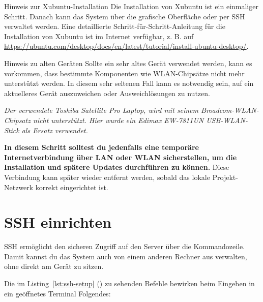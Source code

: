 \begin{InfoBox}{Hinweis zur Xubuntu-Installation}
    \scriptsize Die Installation von Xubuntu ist ein einmaliger Schritt. Danach kann das System über die grafische Oberfläche oder per SSH verwaltet werden. Eine detaillierte Schritt-für-Schritt-Anleitung für die Installation von Xubuntu ist im Internet verfügbar, z. B. auf \url{https://ubuntu.com/desktop/docs/en/latest/tutorial/install-ubuntu-desktop/}.
\end{InfoBox}

\begin{InfoBox}{Hinweis zu alten Geräten}
    \scriptsize Sollte ein sehr altes Gerät verwendet werden, kann es vorkommen, dass bestimmte Komponenten wie WLAN-Chipsätze nicht mehr unterstützt werden. In diesem sehr seltenen Fall kann es notwendig sein, auf ein aktuelleres Gerät auszuweichen oder Ausweichlösungen zu nutzen.
    
    \textit{Der verwendete Toshiba Satellite Pro Laptop, wird mit seinem Broadcom-WLAN-Chipsatz nicht unterstützt. Hier wurde ein Edimax EW-7811UN USB-WLAN-Stick als Ersatz verwendet.}

    \textbf{In diesem Schritt solltest du jedenfalls eine temporäre Internetverbindung über LAN oder WLAN sicherstellen, um die Installation und spätere Updates durchführen zu können.} Diese Verbindung kann später wieder entfernt werden, sobald das lokale Projekt-Netzwerk korrekt eingerichtet ist.
\end{InfoBox}


\section{SSH einrichten}

SSH ermöglicht den sicheren Zugriff auf den Server über die Kommandozeile. Damit kannst du das System auch von einem anderen Rechner aus verwalten, ohne direkt am Gerät zu sitzen.


\label{lst:ssh-setup}

Die im Listing~\ref{lst:ssh-setup} () zu sehenden Befehle bewirken beim Eingeben in ein geöffnetes Terminal Folgendes:

